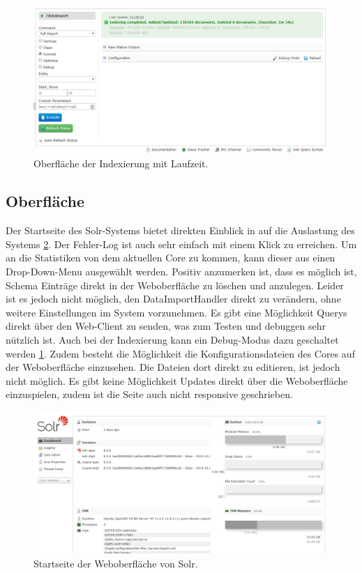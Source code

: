 \begin{figure}
	\centering
	\includegraphics[width=1\linewidth]{images/solr_indexing_time.png}
	\caption{Oberfläche der Indexierung mit Laufzeit.}
	\label{img:solrIndexTime}
\end{figure}

\subsection{Oberfläche}

Der Startseite des Solr-Systems bietet direkten Einblick in auf die Auslastung des Systems \ref{img:solrInterface}. Der Fehler-Log ist auch sehr einfach mit einem Klick zu erreichen. Um an die Statistiken von dem aktuellen Core zu kommen, kann dieser aus einen Drop-Down-Menu ausgewählt werden. Positiv anzumerken ist, dass es möglich ist, Schema Einträge direkt in der Weboberfläche zu löschen und anzulegen. Leider ist es jedoch nicht möglich, den DataImportHandler direkt zu verändern, ohne weitere Einstellungen im System vorzunehmen. Es gibt eine Möglichkeit Querys direkt über den Web-Client zu senden, was zum Testen und debuggen sehr nützlich ist. Auch bei der Indexierung kann ein Debug-Modus dazu geschaltet werden \ref{img:solrIndexTime}. Zudem besteht die Möglichkeit die Konfigurationsdateien des Cores auf der Weboberfläche einzusehen. Die Dateien dort direkt zu editieren, ist jedoch nicht möglich.
Es gibt keine Möglichkeit Updates direkt über die Weboberfläche einzuspielen, zudem ist die Seite auch nicht responsive geschrieben. 

\begin{figure}
	\centering
	\includegraphics[width=1\linewidth]{images/solr_interface.png}
	\caption{Startseite der Weboberfläche von Solr.}
	\label{img:solrInterface}
\end{figure}


